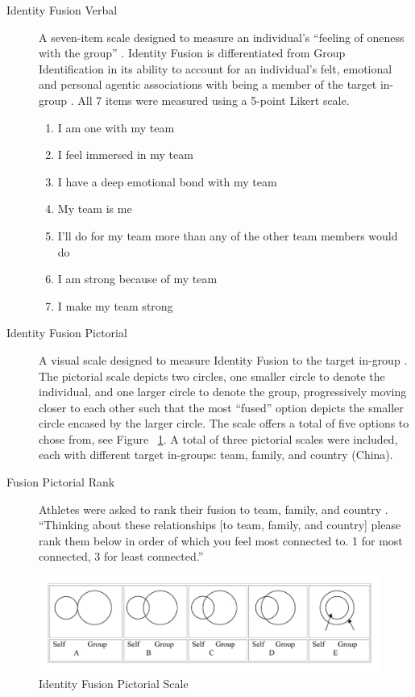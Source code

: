 \begin{description}
  \item [Identity Fusion Verbal] A seven-item scale designed to measure an individual's ``feeling of oneness with the group'' \citep{Swann2009}.  Identity Fusion is differentiated from Group Identification in its ability to account for an individual's felt, emotional and personal agentic associations with being a member of the target in-group \citep{Swann2012a}.  All 7 items were measured using a 5-point Likert scale.
    \begin{enumerate}
      \item I am one with my team
      \item I feel immersed in my team
      \item I have a deep emotional bond with my team
      \item My team is me
      \item I’ll do for my team more than any of the other team members would do
      \item I am strong because of my team
      \item I make my team strong
    \end{enumerate}
  \item [Identity Fusion Pictorial] A visual scale designed to measure Identity Fusion to the target in-group \citep{Swann2009}. The pictorial scale depicts two circles, one smaller circle to denote the individual, and one larger circle to denote the group, progressively moving closer to each other such that the most ``fused'' option depicts the smaller circle encased by the larger circle. The scale offers a total of five options to chose from, see Figure ~\ref{fig:fusionPictorialGroup}.  A total of three pictorial scales were included, each with different target in-groups: team, family, and country (China).
  \item [Fusion Pictorial Rank] Athletes were asked to rank their fusion to team, family, and country \citep{Whitehouse2014}.  ``Thinking about these relationships [to team, family, and country] please rank them below in order of which you feel most connected to. 1 for most connected, 3 for least connected.''
  \end{description}


  \begin{figure}[htbp]
    \includegraphics[width=\linewidth]{images/Identity_Fusion_Pictorial_Scale.png}
    \caption{Identity Fusion Pictorial Scale}
    \label{fig:fusionPictorialGroup}
  \end{figure}


